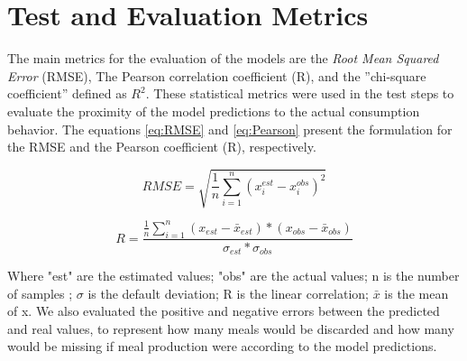     \section{Test and Evaluation Metrics}
       The main metrics for the evaluation of the models are the \textit{Root Mean Squared Error} (RMSE), The Pearson correlation coefficient (R), and the ''chi-square coefficient'' defined as $R^2$. These statistical metrics were used in the test steps to evaluate the proximity of the model predictions to the actual consumption behavior. The equations \ref{eq:RMSE} and \ref{eq:Pearson} present the formulation for the RMSE and the Pearson coefficient (R), respectively.
       
       \begin{equation}
           RMSE = \sqrt{\frac{1}{n}  \sum_{i=1}^n (x_i^{est} - x_i^{obs})^2}
           \label{eq:RMSE}
       \end{equation}
       
       \begin{equation}
           R = \frac{\frac{1}{n}  \sum_{i=1}^n (x_{est} - \bar{x}_{est}) * (x_{obs} - \bar{x}_{obs})}{\sigma_{est} * \sigma_{obs} }
           \label{eq:Pearson}
       \end{equation}
       
       Where "est" are the estimated values; "obs" are the actual values; n is the number of samples ; $\sigma$  is the default deviation; R is the linear correlation; $\bar{x}$ is the mean of x. We also evaluated the positive and negative errors between the predicted and real values, to represent how many meals would be discarded and how many would be missing if meal production were according to the model predictions.
       
